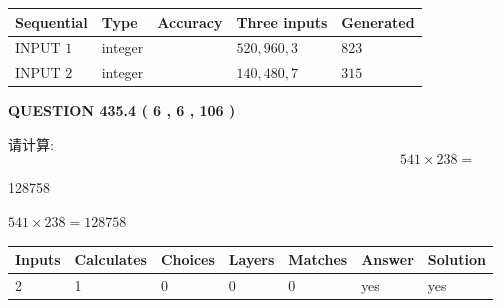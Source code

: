 \documentclass{ctexart}
\begin{document}
   
  
  
\noindent\begin{tabular}{|l|l|l|l|l|}
\hline
 Sequential & Type & Accuracy & Three inputs & Generated \\ 
\hline
 
 
  INPUT $  1 $ & integer &  & $
 520
 , 
 960
 , 
 3
 $ & $ 823 $ 
 \\  \hline  
 
 
  INPUT $  2 $ & integer &  & $
 140
 , 
 480
 , 
 7
 $ & $ 315 $ 
 \\  \hline  
 \end{tabular}
   
   
  
\vspace{0.2in}
  
{\textbf{\Large{QUESTION
435.4 
 ( 6 , 6 , 106 )
}}}
  
  
 
请计算:
\begin{equation}
541  \times    %
238 = \nonumber
\end{equation}
 
 
 
\noindent{}
 
 

128758
 
 
\noindent{}
 
 

 
 
 
\noindent{}
 
 

$ %
541 \times  %
238=   %
128758$
 
 
\noindent{}
 
 

 
   
   
   
   
\noindent\begin{tabular}{|l|l|l|l|l|l|l|}
 \hline
Inputs & Calculates & Choices & Layers & Matches & Answer & Solution \\ \hline
 2  & 
 1  & 
 0
  & 
 0  & 
 0  & 
  yes & 
  yes 
  \\ \hline
 \end{tabular}
   
\end{document}
